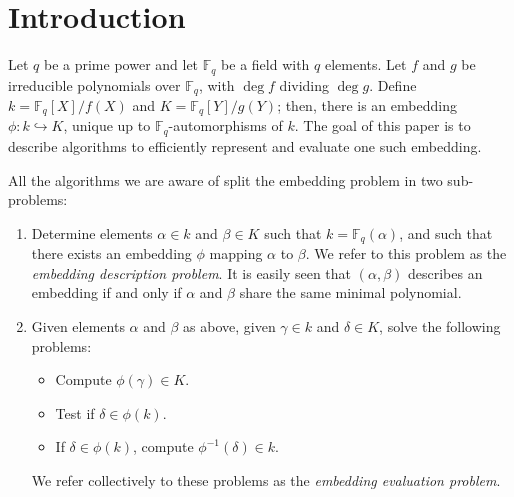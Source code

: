 \documentclass{mcom-l}
\theoremstyle{plain}
\theoremstyle{definition}
\newcommand{\F}{\ensuremath{\mathbb{F}}}
\newcounter{algorithm}
\begin{document}
\section{Introduction}
\label{sec:introduction}

Let $q$ be a prime power and let $\F_q$ be a field with $q$
elements. Let $f$ and $g$ be irreducible polynomials over $\F_q$, with
$\deg f$ dividing $\deg g$. Define $k=\F_q[X]/f(X)$ and
$K=\F_q[Y]/g(Y)$; then, there is an embedding $\phi:k\hookrightarrow
K$, unique up to $\F_q$-automorphisms of $k$. The goal of this paper
is to describe algorithms to efficiently represent and evaluate one
such embedding.

All the algorithms we are aware of split the embedding problem in two
sub-problems:
\begin{enumerate}
\item Determine elements $\alpha\in k$ and $\beta\in K$ such that
  $k=\F_q(\alpha)$, and such that there exists an
  embedding $\phi$ mapping $\alpha$ to $\beta$. We refer to this
  problem as the \emph{embedding description problem}.
  It is easily seen that $(\alpha,\beta)$ describes an embedding
  if and only if $\alpha$ and $\beta$ share the same minimal polynomial.
\item Given elements $\alpha$ and $\beta$ as above, given $\gamma\in
  k$ and $\delta\in K$, solve the following problems:
  \begin{itemize}
  \item Compute $\phi(\gamma)\in K$.
  \item Test if $\delta\in\phi(k)$.
  \item If $\delta\in\phi(k)$, compute $\phi^{-1}(\delta)\in k$.
  \end{itemize}
  We refer collectively to these problems as the \emph{embedding
    evaluation problem}.
\end{enumerate}
\end{document}
